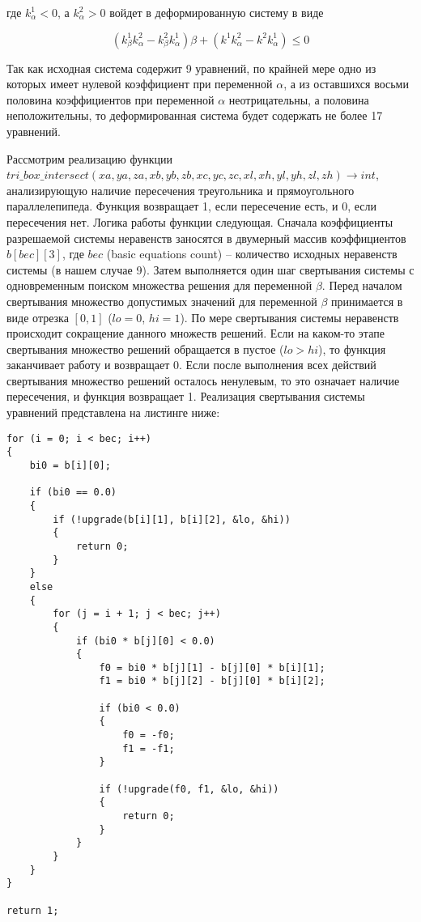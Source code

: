 \documentclass[
11pt,%
tightenlines,%
twoside,%
onecolumn,%
nofloats,%
nobibnotes,%
nofootinbib,%
superscriptaddress,%
noshowpacs,%
centertags]%
{revtex4}
\begin{document}
где $k_{\alpha}^1 < 0$, а $k_{\alpha}^2 > 0$ войдет в деформированную систему в виде

\begin{equation}
(k_{\beta}^1 k_{\alpha}^2 - k_{\beta}^2 k_{\alpha}^1)\beta + (k^1 k_{\alpha}^2 - k^2 k_{\alpha}^1) \le 0
\end{equation}

Так как исходная система содержит 9 уравнений, по крайней мере одно из которых имеет нулевой коэффициент при переменной $\alpha$, а из оставшихся восьми половина коэффициентов при переменной $\alpha$ неотрицательны, а половина неположительны, то деформированная система будет содержать не более 17 уравнений.

Рассмотрим реализацию функции \\
$tri\_box\_intersect(xa, ya, za, xb, yb, zb, xc, yc, zc, xl, xh, yl, yh, zl, zh) \rightarrow int$, анализирующую наличие пересечения треугольника и прямоугольного параллелепипеда.
Функция возвращает 1, если пересечение есть, и 0, если пересечения нет.
Логика работы функции следующая.
Сначала коэффициенты разрешаемой системы неравенств заносятся в двумерный массив коэффициентов $b[bec][3]$, где $bec$ (basic equations count) -- количество исходных неравенств системы (в нашем случае 9).
Затем выполняется один шаг свертывания системы с одновременным поиском множества решения для переменной $\beta$.
Перед началом свертывания множество допустимых значений для переменной $\beta$ принимается в виде отрезка $[0, 1]$ ($lo = 0$, $hi = 1$).
По мере свертывания системы неравенств происходит сокращение данного множеств решений.
Если на каком-то  этапе свертывания множество решений обращается в пустое ($lo > hi$), то функция заканчивает работу и возвращает 0.
Если после выполнения всех действий свертывания множество решений осталось ненулевым, то это означает наличие пересечения, и функция возвращает 1.
Реализация свертывания системы уравнений представлена на листинге ниже:

\begin{lstlisting}[caption={Исходная реализация свертывания системы линейных неравенств для определения пересечения треугольника и прямоугольного параллелепипеда.},label={lst:prac_intersect_1}]
for (i = 0; i < bec; i++)
{
    bi0 = b[i][0];

    if (bi0 == 0.0)
    {
        if (!upgrade(b[i][1], b[i][2], &lo, &hi))
        {
            return 0;
        }
    }
    else
    {
        for (j = i + 1; j < bec; j++)
        {
            if (bi0 * b[j][0] < 0.0)
            {
                f0 = bi0 * b[j][1] - b[j][0] * b[i][1];
                f1 = bi0 * b[j][2] - b[j][0] * b[i][2];

                if (bi0 < 0.0)
                {
                    f0 = -f0;
                    f1 = -f1;
                }

                if (!upgrade(f0, f1, &lo, &hi))
                {
                    return 0;
                }
            }
        }
    }
}

return 1;
\end{lstlisting}
\end{document}
